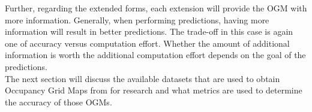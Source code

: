 Further, regarding the extended forms, each extension will provide the \gls{OGM} with more information. Generally, when performing predictions, having more information will result in better predictions. The trade-off in this case is again one of accuracy versus computation effort. Whether the amount of additional information is worth the additional computation effort depends on the goal of the predictions. \\

The next section will discuss the available datasets that are used to obtain Occupancy Grid Maps from for research and what metrics are used to determine the accuracy of those OGMs. 

